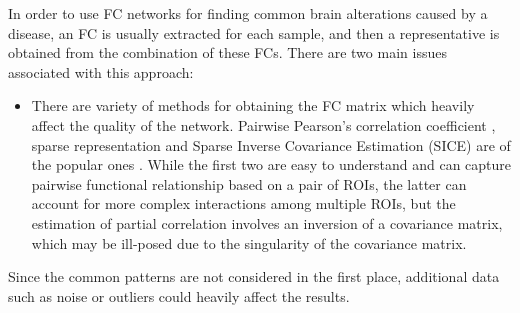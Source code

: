 \documentclass[journal]{IEEEtran}
\begin{document}
 

%	
%	


In order to use FC networks for finding common brain alterations caused by a disease, an FC is usually extracted for each sample, and then a representative is obtained from the combination of these FCs. 
There are two main issues associated with this approach:
\begin{itemize}
	\item There are variety of methods for obtaining the FC matrix which heavily affect the quality of the network. Pairwise Pearson’s correlation coefficient \cite{r10, r11}, sparse representation \cite{r10, r12, r13}  and Sparse Inverse Covariance Estimation (SICE) are of the popular ones \cite{r14, r15}. While the first two are easy to understand and can capture pairwise functional relationship based on a pair of ROIs, the latter can account for more complex interactions among multiple ROIs, but the estimation of partial correlation involves an inversion of a covariance matrix, which may be ill-posed due to the singularity of the covariance matrix. 
	
	
\end{itemize}

 Since the common patterns are not considered in the first place, additional data such as noise or outliers could heavily affect the results.
\end{document}
